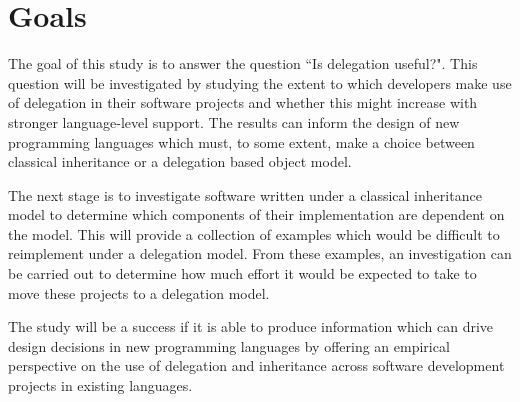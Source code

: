 \section{Goals}
The goal of this study is to answer the question ``Is delegation useful?". This question will be investigated by studying the extent to which developers make use of delegation in their software projects and whether this might increase with stronger language-level support. The results can inform the design of new programming languages which must, to some extent, make a choice between classical inheritance or a delegation based object model.
\newline

The next stage is to investigate software written under a classical inheritance model to determine which components of their implementation are dependent on the model. This will provide a collection of examples which would be difficult to reimplement under a delegation model. From these examples, an investigation can be carried out to determine how much effort it would be expected to take to move these projects to a delegation model.
\newline

The study will be a success if it is able to produce information which can drive design decisions in new programming languages by offering an empirical perspective on the use of delegation and inheritance across software development projects in existing languages.